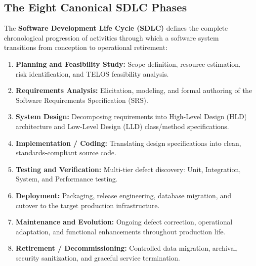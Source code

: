 \subsection{The Eight Canonical SDLC Phases}
The \textbf{Software Development Life Cycle (SDLC)} defines the complete chronological progression of activities through which a software system transitions from conception to operational retirement:
\begin{enumerate}
    \item \textbf{Planning and Feasibility Study:} Scope definition, resource estimation, risk identification, and TELOS feasibility analysis.
    \item \textbf{Requirements Analysis:} Elicitation, modeling, and formal authoring of the Software Requirements Specification (SRS).
    \item \textbf{System Design:} Decomposing requirements into High-Level Design (HLD) architecture and Low-Level Design (LLD) class/method specifications.
    \item \textbf{Implementation / Coding:} Translating design specifications into clean, standards-compliant source code.
    \item \textbf{Testing and Verification:} Multi-tier defect discovery: Unit, Integration, System, and Performance testing.
    \item \textbf{Deployment:} Packaging, release engineering, database migration, and cutover to the target production infrastructure.
    \item \textbf{Maintenance and Evolution:} Ongoing defect correction, operational adaptation, and functional enhancements throughout production life.
    \item \textbf{Retirement / Decommissioning:} Controlled data migration, archival, security sanitization, and graceful service termination.
\end{enumerate}

